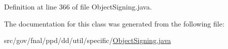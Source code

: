 Definition at line 366 of file Object\-Signing.\-java.



The documentation for this class was generated from the following file\-:\begin{DoxyCompactItemize}
\item 
src/gov/fnal/ppd/dd/util/specific/\hyperlink{ObjectSigning_8java}{Object\-Signing.\-java}\end{DoxyCompactItemize}
